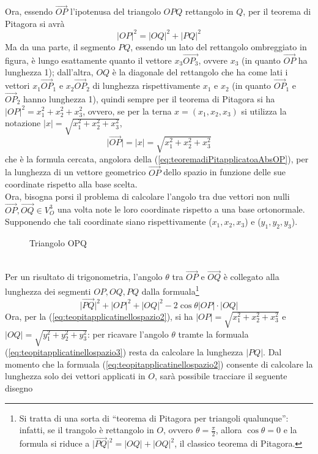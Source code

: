 \documentclass{book}
\newcommand{\abs}[1]{\lvert#1\rvert}
\theoremstyle{definition}
\theoremstyle{plain}
\begin{document}
Ora, essendo $\vec{OP}$ l'ipotenusa del triangolo $OPQ$ rettangolo in $Q$, per il teorema di Pitagora si avrà
\begin{equation}
  \label{eq:teopitapplicatinellospazio}
  \abs{OP}^2=\abs{OQ}^2+\abs{PQ}^2
\end{equation}
Ma da una parte, il segmento $PQ$, essendo un lato del rettangolo ombreggiato in figura, è lungo esattamente quanto il vettore $x_3\vec{OP_3}$, ovvere $x_3$ (in quanto $\vec{OP}$ ha lunghezza 1); dall'altra, $OQ$ è la diagonale del rettangolo che ha come lati i vettori $x_1\vec{OP}_1$ e $x_2\vec{OP}_2$ di lunghezza rispettivamente $x_1$ e $x_2$ (in quanto $\vec{OP}_1$ e $\vec{OP}_2$ hanno lunghezza 1), quindi sempre per il teorema di Pitagora si ha $\abs{OP}^2=x_1^2+x_2^2+x_3^2$, ovvero, se per la terna $x=(x_1,x_2,x_3)$ si utilizza la notazione $\abs{x}=\sqrt{x_1^2+x_2^2+x_3^2}$,
\begin{equation}
  \label{eq:teopitapplicatinellospazio2}
  \abs{\vec{OP}}=\abs{x}=\sqrt{x_1^2+x_2^2+x_3^2}
\end{equation}
che è la formula cercata, angolora della (\ref{eq:teoremadiPitapplicatoaAbsOP}), per la lunghezza di un vettore geometrico $\vec{OP}$ dello spazio in funzione delle sue coordinate rispetto alla base scelta.\\
Ora, bisogna porsi il problema di calcolare l'angolo tra due vettori non nulli $\vec{OP}, \vec{OQ}\in V_O^3$ una volta note le loro coordinate rispetto a una base ortonormale. Supponendo che tali coordinate siano rispettivamente ($x_1,x_2,x_3$) e ($y_1,y_2,y_3$).
\begin{figure}[ht!]
  \centering
  \resizebox{4cm}{!}{
      
    }
  \caption{Triangolo OPQ}
  \label{fig:triangoloOPQ1}
\end{figure}\\
Per un risultato di trigonometria, l'angolo $\theta$ tra $\vec{OP}$ e $\vec{OQ}$ è collegato alla lunghezza dei segmenti $OP,OQ,PQ$ dalla formuala\footnote{Si tratta di una sorta di ``teorema di Pitagora per triangoli qualunque'': infatti, se il trangolo è rettangolo in $O$, ovvero $\theta=\frac{\pi}{2}$, allora $\cos\theta=0$ e la formula si riduce a $\abs{\vec{PQ}}^2=\abs{OQ}+\abs{OQ}^2$, il classico teorema di Pitagora.}
\begin{equation}
  \label{eq:teopitapplicatinellospazio3}
  \abs{\vec{PQ}}^2+\abs{OP}^2+\abs{OQ}^2-2\cos\theta\abs{OP}\cdot\abs{OQ}
\end{equation}
Ora, per la (\ref{eq:teopitapplicatinellospazio2}), si ha $\abs{OP}=\sqrt{x_1^2+x_2^2+x_3^2}$ e $\abs{OQ}=\sqrt{y_1^2+y_2^2+y_3^2}$: per ricavare l'angolo $\theta$ tramte la formuala (\ref{eq:teopitapplicatinellospazio3}) resta da calcolare la lunghezza $\abs{PQ}$. Dal momento che la formuala (\ref{eq:teopitapplicatinellospazio2}) consente di calcolare la lunghezza solo dei vettori applicati in $O$, sarà possibile tracciare il seguente disegno
\end{document}
